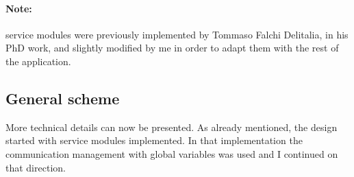 \paragraph{Note: } service modules were previously implemented by Tommaso Falchi Delitalia, in his PhD work, and slightly modified by me in order to adapt them with the rest of the application.

\subsection{General scheme}

More technical details can now be presented. As already mentioned, the design started with service modules implemented. In that implementation the communication management with global variables was used and I continued on that direction. 

